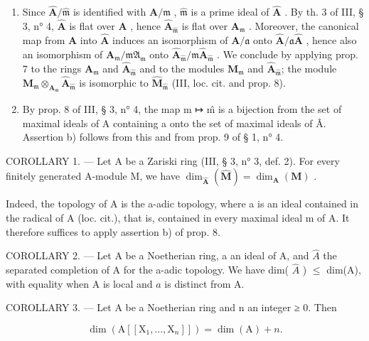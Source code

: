 \begin{enumerate}
\def\labelenumi{\alph{enumi})}
\item
  Since \(\hat{\mathbf{A}}/\hat{\mathfrak{m}}\) is identified with \(\mathbf{A}/\mathfrak{m}\) , \(\hat{\mathfrak{m}}\) is a prime ideal of \(\hat{\mathbf{A}}\) . By th. 3 of III, § 3, n° 4, \(\hat{\mathbf{A}}\) is flat over \(\mathbf{A}\) , hence \(\hat{\mathbf{A}}_{\hat{\mathfrak{m}}}\) is flat over \(\mathbf{A}_{\mathfrak{m}}\) . Moreover, the canonical map from \(\mathbf{A}\) into \(\hat{\mathbf{A}}\) induces an isomorphism of \(\mathbf{A}/\mathfrak{a}\) onto \(\hat{\mathbf{A}}/\mathfrak{a}\hat{\mathbf{A}}\) , hence also an isomorphism of \(\mathbf{A}_{\mathfrak{m}}/\mathfrak{mA}_{\mathfrak{m}}\) onto \(\hat{\mathbf{A}}_{\hat{\mathfrak{m}}}/\mathfrak{m}\hat{\mathbf{A}}_{\hat{\mathfrak{m}}}\) . We conclude by applying prop. 7 to the rings \(\mathbf{A}_{\mathfrak{m}}\) and \(\hat{\mathbf{A}}_{\hat{\mathfrak{m}}}\) and to the modules \(\mathbf{M}_{\mathfrak{m}}\) and \(\hat{\mathbf{A}}_{\hat{\mathfrak{m}}}\); the module \(\mathbf{M}_{\mathfrak{m}} \otimes_{\mathbf{A}_{\mathfrak{m}}} \hat{\mathbf{A}}_{\hat{\mathfrak{m}}}\) is isomorphic to \(\hat{\mathbf{M}}_{\hat{\mathfrak{m}}}\) (III, loc. cit. and prop. 8).
\item
  By prop. 8 of III, § 3, n° 4, the map m ↦ m̂ is a bijection from the set of maximal ideals of A containing a onto the set of maximal ideals of Â. Assertion b) follows from this and from prop. 9 of § 1, n° 4.
\end{enumerate}

COROLLARY 1. --- Let A be a Zariski ring (III, § 3, n° 3, def. 2). For every finitely generated A-module M, we have \(\dim_{\hat{\mathbf{A}}}(\hat{\mathbf{M}}) = \dim_{\mathbf{A}}(\mathbf{M})\) .

Indeed, the topology of A is the a-adic topology, where a is an ideal contained in the radical of A (loc. cit.), that is, contained in every maximal ideal m of A. It therefore suffices to apply assertion b) of prop. 8.

COROLLARY 2. --- Let A be a Noetherian ring, a an ideal of A, and \(\hat{A}\) the separated completion of A for the a-adic topology. We have dim( \(\hat{A}\) ) \(\leqslant\) dim(A), with equality when A is local and \(a\) is distinct from A.

COROLLARY 3. --- Let A be a Noetherian ring and n an integer ≥ 0. Then

\[
\dim (\mathrm{A} [ [ \mathrm{X} _ {1},..., \mathrm{X} _ {n} ] ]) = \dim (\mathrm{A}) + n.
\]

